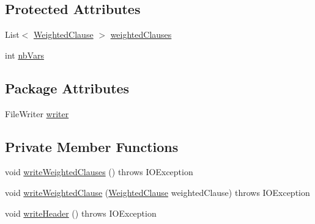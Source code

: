 \subsection*{Protected Attributes}
\begin{DoxyCompactItemize}
\item 
List$<$ \hyperlink{classedu_1_1pku_1_1id_1_1_weighted_clause}{WeightedClause} $>$ \hyperlink{classedu_1_1pku_1_1id_1_1_weighted_max_s_a_t_writer_a73dc99c36bfbaf938f3ffb7b95189d37}{weightedClauses}
\item 
int \hyperlink{classedu_1_1pku_1_1id_1_1_weighted_max_s_a_t_writer_ae9c3e5d651a1b8100fd5d85f00a18a54}{nbVars}
\end{DoxyCompactItemize}
\subsection*{Package Attributes}
\begin{DoxyCompactItemize}
\item 
FileWriter \hyperlink{classedu_1_1pku_1_1id_1_1_weighted_max_s_a_t_writer_a6804c608ef104e3ee760359325c9fd55}{writer}
\end{DoxyCompactItemize}
\subsection*{Private Member Functions}
\begin{DoxyCompactItemize}
\item 
void \hyperlink{classedu_1_1pku_1_1id_1_1_weighted_max_s_a_t_writer_aee8f85aa6cf3ef30a1b2a1f1a69585bc}{writeWeightedClauses} ()  throws IOException 
\item 
void \hyperlink{classedu_1_1pku_1_1id_1_1_weighted_max_s_a_t_writer_acdb3644a2754695c63b536a466787a24}{writeWeightedClause} (\hyperlink{classedu_1_1pku_1_1id_1_1_weighted_clause}{WeightedClause} weightedClause)  throws IOException 
\item 
void \hyperlink{classedu_1_1pku_1_1id_1_1_weighted_max_s_a_t_writer_a466550c5948e4d6e453be69374858568}{writeHeader} ()  throws IOException 
\end{DoxyCompactItemize}


